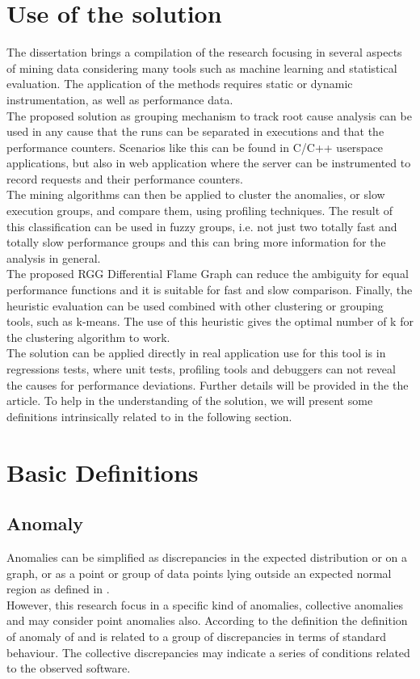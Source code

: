 \section{Use of the solution}  %
The dissertation brings a compilation of the research focusing in several aspects of mining data considering many tools such as machine learning and statistical evaluation. The application of the methods requires static or dynamic instrumentation, as well as performance data.\\
The proposed solution as grouping mechanism to track root cause analysis can be used in any cause that the runs can be separated in executions and that the performance counters. Scenarios like this can be found in C/C++ userspace applications, but also in web application where the server can be instrumented to record requests and their performance counters.\\
The mining algorithms can then be applied to cluster the anomalies, or slow execution groups, and compare them, using profiling techniques. The result of this classification can be used in fuzzy groups, i.e. not just two totally fast and totally slow performance groups and this can bring more information for the analysis in general.\\
The proposed RGG Differential Flame Graph can reduce the ambiguity for equal performance functions and it is suitable for fast and slow comparison. 
Finally, the heuristic evaluation can be used combined with other clustering or grouping tools, such as k-means. The use of this heuristic gives the optimal number of k for the clustering algorithm to work. \\
The solution can be applied directly in real application use for this tool is in regressions tests, where unit tests, profiling tools and debuggers can not reveal the causes for performance deviations. Further details will be provided in the the article.
To help in the understanding of the solution, we will present some definitions intrinsically related to in the following section.

\section{Basic Definitions}  %

\subsection{Anomaly}
Anomalies can be simplified as discrepancies in the expected distribution or on a graph, or as a point or group of data points lying outside an expected normal region as defined in \cite{das_detection}. \\
However, this research focus in a specific kind of anomalies, collective anomalies and may consider point anomalies also. According to the definition the definition of anomaly of \cite{Chandola2009ADS15418801541882} and is related to a group of discrepancies in terms of standard behaviour. The collective discrepancies may indicate a series of conditions related to the observed software.\\
